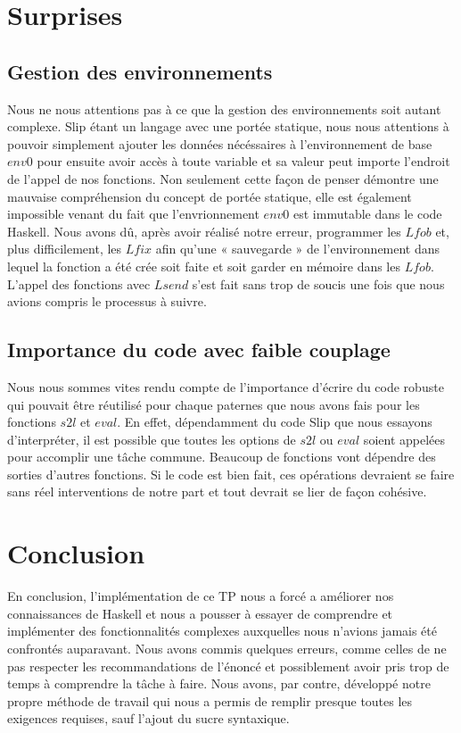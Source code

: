 \documentclass{article}
\begin{document}
	\section{Surprises}
	\subsection{Gestion des environnements}
	Nous ne nous attentions pas à ce que la gestion des environnements soit autant
	complexe. Slip étant un langage avec une portée statique, nous nous attentions
	à pouvoir simplement ajouter les données nécéssaires à l'environnement de base
	$env0$ pour ensuite avoir accès à toute variable et sa valeur peut importe l'endroit
	de l'appel de nos fonctions. Non seulement cette façon de penser démontre une mauvaise
	compréhension du concept de portée statique, elle est également impossible
	venant du fait que l'envrionnement $env0$ est immutable dans le code Haskell. Nous
	avons dû, après avoir réalisé notre erreur, programmer les $Lfob$ et, plus
	difficilement, les $Lfix$ afin qu'une « sauvegarde » de l'environnement dans lequel
	la fonction a été crée soit faite et soit garder en mémoire dans les $Lfob$. L'appel
	des fonctions avec $Lsend$ s'est fait sans trop de soucis une fois que nous
	avions compris le processus à suivre.

	\subsection{Importance du code avec faible couplage}
	Nous nous sommes vites rendu compte de l'importance d'écrire du code robuste
	qui pouvait être réutilisé pour chaque paternes que nous avons fais pour les
	fonctions $s2l$ et $eval$. En effet, dépendamment du code Slip que nous
	essayons d'interpréter, il est possible que toutes les options de $s2l$ ou $eva
	l$ soient appelées pour accomplir une tâche commune. Beaucoup de fonctions
	vont dépendre des sorties d'autres fonctions. Si le code est bien fait, ces
	opérations devraient se faire sans réel interventions de notre part et tout
	devrait se lier de façon cohésive.

	\section{Conclusion}
	En conclusion, l'implémentation de ce TP nous a forcé a améliorer nos connaissances
	de Haskell et nous a pousser à essayer de comprendre et implémenter des fonctionnalités
	complexes auxquelles nous n'avions jamais été confrontés auparavant. Nous
	avons commis quelques erreurs, comme celles de ne pas respecter les recommandations
	de l'énoncé et possiblement avoir pris trop de temps à comprendre la tâche à faire.
	Nous avons, par contre, développé notre propre méthode de travail qui nous a
	permis de remplir presque toutes les exigences requises, sauf l'ajout du sucre
	syntaxique.
\end{document}
